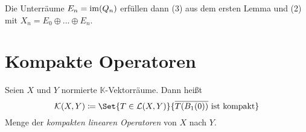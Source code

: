 \documentclass{cheat-sheet}
\newcommand{\K}{\mathbb{K}}
\newcommand{\LSO}{\mathcal{L}} %
\begin{document}
\begin{samepage}
Die Unterräume $E_n = \mathop{\mathrm{im}}(Q_n)$ erfüllen dann (3) aus dem ersten Lemma und (2) mit $X_n = E_0 \oplus ... \oplus E_n$.
\fi

\iffalse
\begin{bsp}
  \begin{itemize}
    \item Ist $X$ Hilbertraum und $X = \overline{\bigcup_{n \in \N} X_n}$ mit $\mathrm{dim} X_n < \infty$, $X_n \subset X_{n+1}$, so sei $P_n$ die orthogonale Projektion auf $X_n$ und mit $X_{n+1} = X_n \perp E_n$ sei $Q_n$ die orthogonale Projektion auf $E_n$. Ist speziell $X_n = \mathrm{span} \Set{ e_i }{ 0 \leq i \leq n }$ mit einer ONB $(e_i)_{i \in \N}$, so ist
    \[ Q_n x = (x | e_n) e_n \quad \text{und} \quad P_n x = \sum_{i=0}^n (x|e_i) e_i \]
    \item Zerlege $[0, 1]$ in Punkte $M_n = \Set{ x_{n,i} }{ i = 0, ...., m_n }$ mit $0 = x_{n,0} < ... < x_{n,m} = 1$ und $h_n = \max_{i} \abs{x_{n_i,i} - x_{n_i,i-1}} \xrightarrow{n \to \infty} 0$ sowie $\fa{n \in \N} M_n \subset M_{n+1}$. Sei $A_{n_i,i} = (x_{n_i,i}, x_{n_i,i})$, $h_{n_i,i} = x_{n_i,i} - x_{n_i,i-1}$. Dann ist der Raum der stückweise konstanten Funktionen bzgl. dieser Zerlegung auf Level $n$:
    \[ X_n = \Set{ \sum_{i=1}^m \alpha_i \chi_{A_{n_i,i}} }{ \alpha_i \in \K }, \mathrm{dim}(X_n) = m_n \]
    Für $f \in L^1(\left] 0, 1 \right[)$ definiere $P_n f = \sum_{i=1}^{m_n} (\frac{1}{n_{n_i,i}} \Int{A_{n_i,i}}{}{f(s)}{s}) \chi_{A_{n_i,i}}$.
    Es ist $\mathrm{im}(P_1) = X_n$ und für die Standardzerlegung $x_{n_i,i} = i 2^{-n}$ ist $E_n = \mathrm{span} \Set{ e_{n_i} }{  1 \leq i \leq 2^{n-1} }$ mit $e_0 = \chi_{\left] 0, 1 \right[}, e_{n,i} = \chi_{A_{n,2i-1}} - \chi_{A_{n,2i}}$.
  \end{itemize}
\end{bsp}
\fi


\section{Kompakte Operatoren}

\end{samepage}

\begin{defn}
  Seien $X$ und $Y$ normierte $\K$-Vektorräume. Dann heißt
  \[ \mathcal{K}(X, Y) \coloneqq \Set{ T \in \LSO(X, Y) }{ \overline{T(B_1(0))} \text{ ist kompakt} } \]
  Menge der \emph{kompakten linearen Operatoren} von $X$ nach $Y$.
\end{defn}
\end{document}
